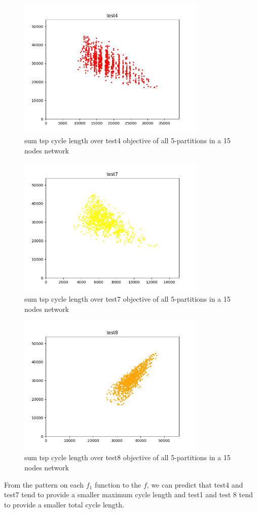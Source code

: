 \begin{figure}[h!]
\centering
\includegraphics[width=0.8\textwidth]{assets/test4sum.png}
\caption{sum tsp cycle length over test4 objective of all 5-partitions in a 15 nodes network}
\label{fig:test4sum}
\end{figure}

\begin{figure}[h!]
\centering
\includegraphics[width=0.8\textwidth]{assets/test7sum.png}
\caption{sum tsp cycle length over test7 objective of all 5-partitions in a 15 nodes network}
\label{fig:test7sum}
\end{figure}

\begin{figure}[h!]
\centering
\includegraphics[width=0.8\textwidth]{assets/test8sum.png}
\caption{sum tsp cycle length over test8 objective of all 5-partitions in a 15 nodes network}
\label{fig:test8sum}
\end{figure}

From the pattern on each $f_1$ function to the $f$, we can predict that test4 and test7 tend to provide a smaller maximum cycle length and test1 and test 8 tend to provide a smaller total cycle length.

